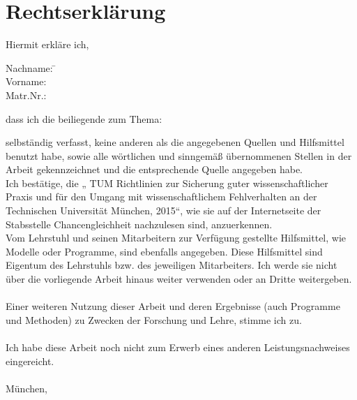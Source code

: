 
\chapter*{Rechtserklärung}

Hiermit erkläre ich,
\begin{tabbing}
Nachname: \= \lastn \\
Vorname: \> \firstn \\
Matr.Nr.: \> \matrnr \\
\end{tabbing}
dass ich die beiliegende \thesistype zum Thema:
\begin{center}
\MyTitle
\end{center}
selbständig verfasst, keine anderen als die angegebenen Quellen und Hilfsmittel benutzt habe, sowie alle wörtlichen und sinngemäß übernommenen Stellen in der Arbeit gekennzeichnet und die entsprechende Quelle angegeben habe.\\
Ich bestätige, die „ TUM Richtlinien zur Sicherung guter wissenschaftlicher Praxis und für den Umgang mit wissenschaftlichem Fehlverhalten an der Technischen Universität München, 2015“, wie sie auf der Internetseite der Stabsstelle Chancengleichheit nachzulesen sind, anzuerkennen.\\
Vom Lehrstuhl und seinen Mitarbeitern zur Verfügung gestellte Hilfsmittel, wie Modelle oder Programme, sind ebenfalls angegeben. Diese Hilfsmittel sind Eigentum des Lehrstuhls bzw. des jeweiligen Mitarbeiters. Ich werde sie nicht über die vorliegende Arbeit hinaus weiter verwenden oder an Dritte weitergeben. \\
\vspace*{1cm}\\
Einer weiteren Nutzung  dieser Arbeit und deren Ergebnisse (auch Programme und Methoden) zu Zwecken der Forschung und Lehre, stimme ich zu.\\
\vspace*{1cm}\\
Ich  habe  diese  Arbeit  noch  nicht  zum  Erwerb  eines  anderen  Leistungsnachweises eingereicht.\\
\vspace*{2cm}\\
München, \dateosub \hspace{0.5cm} \makebox[1.5in]{\hrulefill}